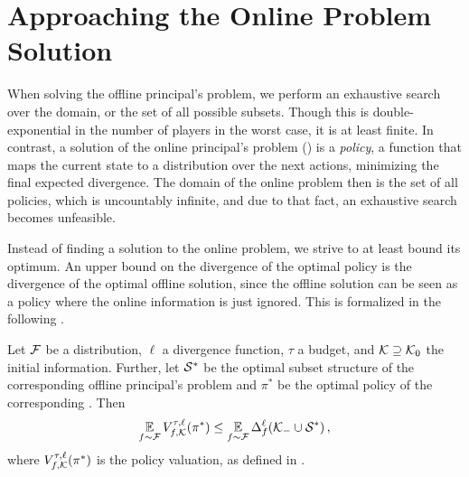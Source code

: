 \section{Approaching the Online Problem Solution}

When solving the offline principal's problem, we perform an exhaustive search over the domain, or the set of all possible subsets.
Though this is double-exponential in the number of players in the worst case, it is at least finite.
In contrast, a solution of the online principal's problem () is a \emph{policy}, a function that maps the current state to a distribution over the next actions, minimizing the final expected divergence.
The domain of the online problem then is the set of all policies, which is uncountably infinite, and due to that fact, an exhaustive search becomes unfeasible.

Instead of finding a solution to the online problem, we strive to at least bound its optimum.
An upper bound on the divergence of the optimal policy is the divergence of the optimal offline solution, since the offline solution can be seen as a policy where the online information is just ignored.
This is formalized in the following .

\begin{prop}
  \label{thm:online-bound-offline}
  Let $ \mathcal{F} $ be a distribution, $ \ell $ a divergence function, $ \tau $ a budget, and $ \mathcal{K} \supseteq \mathcal{K}_0 $ the initial information.
  Further, let $ \mathcal{S}^* $ be the optimal subset structure of the corresponding offline principal's problem and $ \pi^* $ be the optimal policy of the corresponding .
  Then \[
    \operatorname*{\mathbb{E}}_{f \sim \mathcal{F}} V^{\tau,\ell}_{f,\mathcal{K}}\!\left(\pi^*\right) \leq \operatorname*{\mathbb{E}}_{f \sim \mathcal{F}} \Delta_{f}^{\ell}\!\left(\mathcal{K}_- \cup \mathcal{S}^*\right),
  \]
  where $ V^{\tau,\ell}_{f,\mathcal{K}}\!\left(\pi^*\right) $ is the policy valuation, as defined in .
\end{prop}

